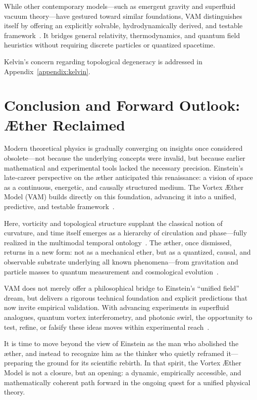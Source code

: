\documentclass[preprint,notitlepage]{revtex4-2}
\begin{document}
While other contemporary models—such as emergent gravity and superfluid vacuum theory—have gestured toward similar foundations, VAM distinguishes itself by offering an explicitly solvable, hydrodynamically derived, and testable framework~\cite{VAM-8, VAM-14, VAM-15}. It bridges general relativity, thermodynamics, and quantum field heuristics without requiring discrete particles or quantized spacetime.

Kelvin's concern regarding topological degeneracy is addressed in Appendix~\ref{appendix:kelvin}.


\section*{Conclusion and Forward Outlook: Æther Reclaimed}

Modern theoretical physics is gradually converging on insights once considered obsolete—not because the underlying concepts were invalid, but because earlier mathematical and experimental tools lacked the necessary precision. Einstein’s late-career perspective on the æther anticipated this renaissance: a vision of space as a continuous, energetic, and causally structured medium. The Vortex Æther Model (VAM) builds directly on this foundation, advancing it into a unified, predictive, and testable framework~\cite{VAM-8, VAM-13, VAM-14}.

Here, vorticity and topological structure supplant the classical notion of curvature, and time itself emerges as a hierarchy of circulation and phase—fully realized in the multimodal temporal ontology~\cite{VAM-13, VAM-15}. The æther, once dismissed, returns in a new form: not as a mechanical ether, but as a quantized, causal, and observable substrate underlying all known phenomena—from gravitation and particle masses to quantum measurement and cosmological evolution~\cite{VAM-8, VAM-11, VAM-15}.

VAM does not merely offer a philosophical bridge to Einstein’s “unified field” dream, but delivers a rigorous technical foundation and explicit predictions that now invite empirical validation. With advancing experiments in superfluid analogues, quantum vortex interferometry, and photonic swirl, the opportunity to test, refine, or falsify these ideas moves within experimental reach~\cite{VAM-2, VAM-13, VAM-15}.

It is time to move beyond the view of Einstein as the man who abolished the æther, and instead to recognize him as the thinker who quietly reframed it—preparing the ground for its scientific rebirth. In that spirit, the Vortex Æther Model is not a closure, but an opening: a dynamic, empirically accessible, and mathematically coherent path forward in the ongoing quest for a unified physical theory.
\end{document}
